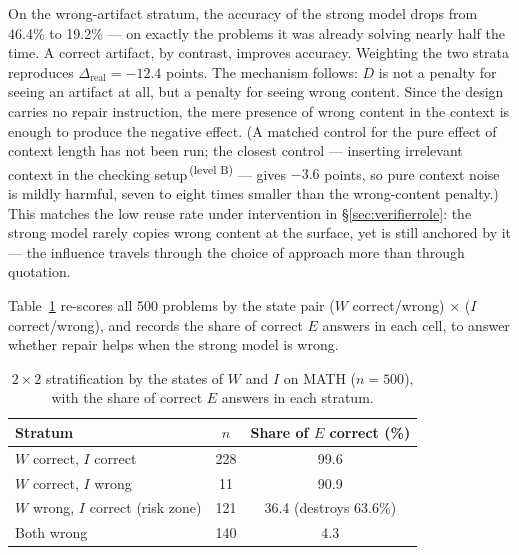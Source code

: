 \documentclass[11pt,a4paper]{article}
\newcommand{\mucB}{\textsuperscript{\,(level B)}}
\newcommand{\dhonest}{\Delta_{\mathrm{real}}}
\begin{document}
On the wrong-artifact stratum, the accuracy of the strong model drops from 46.4\% to 19.2\% --- on exactly the problems it was already solving nearly half the time. A correct artifact, by contrast, improves accuracy. Weighting the two strata reproduces $\dhonest = -12.4$ points. The mechanism follows: $D$ is not a penalty for seeing an artifact at all, but a penalty for seeing wrong content. Since the design carries no repair instruction, the mere presence of wrong content in the context is enough to produce the negative effect. (A matched control for the pure effect of context length has not been run; the closest control --- inserting irrelevant context in the checking setup\mucB{} --- gives $-3.6$ points, so pure context noise is mildly harmful, seven to eight times smaller than the wrong-content penalty.) This matches the low reuse rate under intervention in \S\ref{sec:verifierrole}: the strong model rarely copies wrong content at the surface, yet is still anchored by it --- the influence travels through the choice of approach more than through quotation.

Table~\ref{tab:222} re-scores all 500 problems by the state pair ($W$ correct/wrong) $\times$ ($I$ correct/wrong), and records the share of correct $E$ answers in each cell, to answer whether repair helps when the strong model is wrong.

\begin{table}[htbp]
\centering
\small
\begin{tabular}{@{}l c c@{}}
\toprule
Stratum & $n$ & Share of $E$ correct (\%) \\
\midrule
$W$ correct, $I$ correct & 228 & 99.6\\
$W$ correct, $I$ wrong & 11 & 90.9\\
$W$ wrong, $I$ correct (risk zone) & 121 & 36.4 \quad (destroys 63.6\%)\\
Both wrong & 140 & 4.3\\
\bottomrule
\end{tabular}
\caption{$2\times 2$ stratification by the states of $W$ and $I$ on MATH ($n=500$), with the share of correct $E$ answers in each stratum.}
\label{tab:222}
\end{table}
\end{document}
